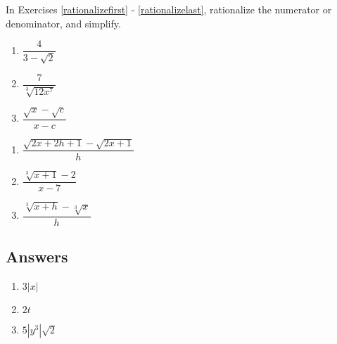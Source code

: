 \documentclass{ximera}
\begin{document}
In Exercises \ref{rationalizefirst} - \ref{rationalizelast}, rationalize the numerator or denominator, and simplify.


\begin{multicols}{3}
\begin{enumerate}
\setcounter{enumi}{\value{HW}}


\item   $\dfrac{4}{3 - \sqrt{2}}$  \label{rationalizefirst}

\item  $\dfrac{7}{\sqrt[3]{12x^7}}$

\item   $\dfrac{\sqrt{x} - \sqrt{c}}{x - c}$ 

\setcounter{HW}{\value{enumi}}
\end{enumerate}
\end{multicols}

\enlargethispage{1in}

\begin{multicols}{3}
\begin{enumerate}
\setcounter{enumi}{\value{HW}}


\item  $\dfrac{\sqrt{2x+2h+1} - \sqrt{2x+1}}{h}$ 

\item  $\dfrac{\sqrt[3]{x+1} - 2}{x- 7}$                                          

\item  $\dfrac{\sqrt[3]{x+h} - \sqrt[3]{x}}{h}$  \label{rationalizelast}

\setcounter{HW}{\value{enumi}}
\end{enumerate}
\end{multicols}


\newpage

\subsection{Answers}

\begin{multicols}{3}
\begin{enumerate}

\item   $3|x|$ 

\item   $2t$

\item   $5|y^3|\sqrt{2}$

\setcounter{HW}{\value{enumi}}
\end{enumerate}
\end{multicols}
\end{document}
